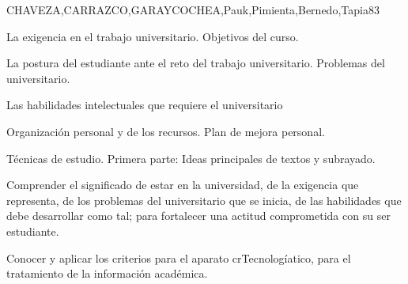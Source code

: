 \begin{syllabus}
\begin{outcomes}
\end{outcomes}

\begin{unit}{}{CHAVEZA,CARRAZCO,GARAYCOCHEA,Pauk,Pimienta,Bernedo,Tapia}{8}{3}
\begin{topics}
        \item La exigencia en el trabajo universitario. Objetivos del curso.
        \item La postura del estudiante ante el reto del trabajo universitario. Problemas  del universitario.     
        \item Las  habilidades intelectuales que requiere el universitario
        \item Organización personal y de los recursos. Plan de mejora personal.
        \item Técnicas de estudio. Primera parte: Ideas principales de textos y subrayado.       
\end{topics}
\begin{learningoutcomes}
        \item Comprender el  significado de estar en  la universidad, de la exigencia que representa, de los problemas del universitario que se inicia, de las habilidades que debe desarrollar como tal; para fortalecer una actitud comprometida con su ser estudiante.
        \item Conocer y aplicar los criterios para el aparato crTecnologíatico, para el tratamiento de la información académica.
\end{learningoutcomes}
\end{unit}


\end{syllabus}
